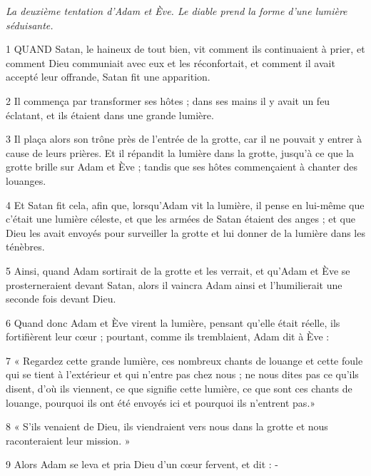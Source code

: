 \par \textit{La deuxième tentation d'Adam et Ève. Le diable prend la forme d'une lumière séduisante.}

\par 1 QUAND Satan, le haineux de tout bien, vit comment ils continuaient à prier, et comment Dieu communiait avec eux et les réconfortait, et comment il avait accepté leur offrande, Satan fit une apparition.

\par 2 Il commença par transformer ses hôtes ; dans ses mains il y avait un feu éclatant, et ils étaient dans une grande lumière.

\par 3 Il plaça alors son trône près de l'entrée de la grotte, car il ne pouvait y entrer à cause de leurs prières. Et il répandit la lumière dans la grotte, jusqu'à ce que la grotte brille sur Adam et Ève ; tandis que ses hôtes commençaient à chanter des louanges.

\par 4 Et Satan fit cela, afin que, lorsqu'Adam vit la lumière, il pense en lui-même que c'était une lumière céleste, et que les armées de Satan étaient des anges ; et que Dieu les avait envoyés pour surveiller la grotte et lui donner de la lumière dans les ténèbres.

\par 5 Ainsi, quand Adam sortirait de la grotte et les verrait, et qu'Adam et Ève se prosterneraient devant Satan, alors il vaincra Adam ainsi et l'humilierait une seconde fois devant Dieu.

\par 6 Quand donc Adam et Ève virent la lumière, pensant qu'elle était réelle, ils fortifièrent leur cœur ; pourtant, comme ils tremblaient, Adam dit à Ève :

\par 7 « Regardez cette grande lumière, ces nombreux chants de louange et cette foule qui se tient à l'extérieur et qui n'entre pas chez nous ; ne nous dites pas ce qu'ils disent, d'où ils viennent, ce que signifie cette lumière, ce que sont ces chants de louange, pourquoi ils ont été envoyés ici et pourquoi ils n'entrent pas.»

\par 8 « S'ils venaient de Dieu, ils viendraient vers nous dans la grotte et nous raconteraient leur mission. »

\par 9 Alors Adam se leva et pria Dieu d'un cœur fervent, et dit : -


